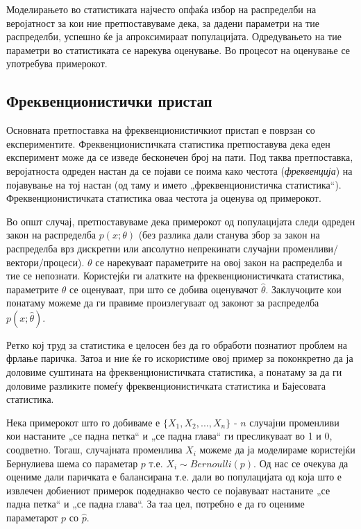 \documentclass[12pt]{article}
\numberwithin{equation}{section}
\begin{document}
Моделирањето во статистиката најчесто опфаќа избор на распределби на веројатност за кои ние претпоставуваме дека, за дадени параметри на тие распределби, успешно ќе ја апроксимираат популацијата. Одредувањето на тие параметри во статистиката се нарекува оценување. Во процесот на оценување се употребува примерокот.

\subsection{Фреквенционистички пристап}

Основната претпоставка на фреквенционистичкиот пристап е поврзан со експериментите. Фреквенционистичката статистика претпоставува дека еден експеримент може да се изведе бесконечен број на пати. Под таква претпоставка, веројатноста одреден настан да се појави се поима како честота (\textit{фреквенција}) на појавување на тој настан (од таму и името „фреквенционистичка статистика“). Фреквенционистичката статистика оваа честота ја оценува од примерокот.

Во општ случај, претпоставуваме дека примерокот од популацијата следи одреден закон на распределба \(p(x; \theta)\) (без разлика дали станува збор за закон на распределба врз дискретни или апсолутно непрекинати случајни променливи/вектори/процеси). \(\theta\) се нарекуваат параметрите на овој закон на распределба и тие се непознати. Користејќи ги алатките на фреквенционистичката статистика, параметрите \(\theta\) се оценуваат, при што се добива оценувачот \(\widehat{\theta}\). Заклучоците кои понатаму можеме да ги правиме произлегуваат од законот за распределба \(p(x; \widehat{\theta})\).

Ретко кој труд за статистика е целосен без да го обработи познатиот проблем на фрлање паричка. Затоа и ние ќе го искористиме овој пример за поконкретно да ја доловиме суштината на фреквенционистичката статистика, а понатаму за да ги доловиме разликите помеѓу фреквенционистичката статистика и Бајесовата статистика.

Нека примерокот што го добиваме е \(\{X_1, X_2, ..., X_n\}\) - \(n\) случајни променливи кои настаните „се падна петка“ и „се падна глава“ ги пресликуваат во 1 и 0, соодветно. Тогаш, случајната променлива \(X_i\) можеме да ја моделираме користејќи Бернулиева шема со параметар \(p\) т.е. \(X_i \sim Bernoulli(p)\). Од нас се очекува да оцениме дали паричката е балансирана т.е. дали во популацијата од која што е извлечен добиениот примерок подеднакво често се појавуваат настаните „се падна петка“ и „се падна глава“. За таа цел, потребно е да го оцениме параметарот \(p\) со \(\widehat{p}\).
\end{document}
